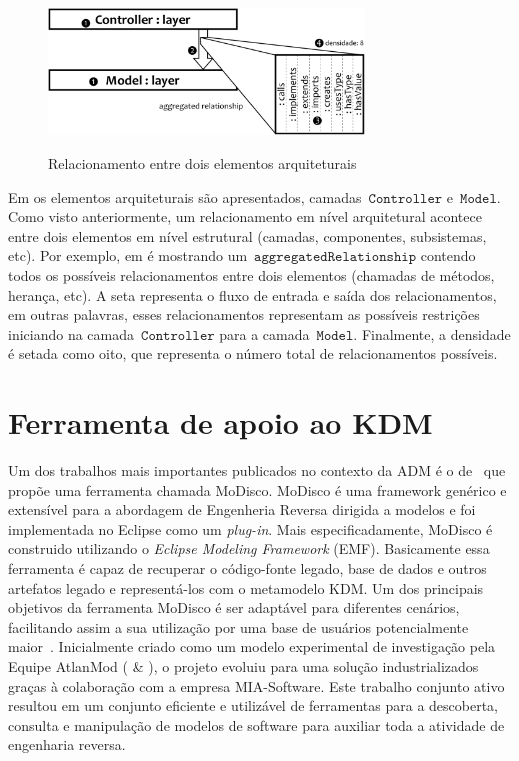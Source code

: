 \begin{figure}[!ht]
	\centering
	\caption{Relacionamento entre dois elementos arquiteturais}
	\includegraphics[width=3.3in]{images/relationshipExample1.pdf}
	\fautor
	\label{fig:relationship_example_1}
\end{figure}


Em  os elementos arquiteturais são apresentados, camadas~$\mathtt{Controller}$ e~$\mathtt{Model}$. Como visto anteriormente, um relacionamento em nível arquitetural acontece entre dois elementos em nível estrutural (camadas, componentes, subsistemas, etc). Por exemplo, em  é mostrando um~$\mathtt{aggregatedRelationship}$ contendo todos os possíveis relacionamentos  entre dois elementos (chamadas de métodos, herança, etc). A seta  representa o fluxo de entrada e saída dos relacionamentos, em outras palavras, esses relacionamentos representam as possíveis restrições iniciando na camada~$\mathtt{Controller}$  para a camada~$\mathtt{Model}$. Finalmente, a densidade  é setada como oito, que representa o número total de relacionamentos possíveis.


\section{Ferramenta de apoio ao KDM}\label{sec:Ferramenta_de_apoio_KDM_capitulo}

Um dos trabalhos mais importantes publicados no contexto da ADM é o de~ que propõe uma ferramenta chamada MoDisco. MoDisco é uma framework genérico e extensível para a abordagem de Engenheria Reversa dirigida a modelos e foi implementada no  Eclipse como um \textit{plug-in}. Mais especificadamente, MoDisco é construido utilizando o \textit{Eclipse Modeling Framework} (EMF). Basicamente essa ferramenta é capaz de recuperar o código-fonte legado, base de dados e outros artefatos legado e representá-los com o metamodelo KDM. Um dos principais objetivos da ferramenta MoDisco é ser adaptável para diferentes cenários, facilitando assim a sua utilização por uma base de usuários potencialmente maior~\cite{Bruneliere_2014}. Inicialmente criado como um modelo experimental de investigação pela Equipe AtlanMod ( \& ), o projeto evoluiu para uma solução industrializados graças à colaboração com a empresa MIA-Software. Este trabalho conjunto ativo resultou em um conjunto eficiente e utilizável de ferramentas para a descoberta, consulta e manipulação de modelos de software para auxiliar toda a atividade de engenharia reversa.

